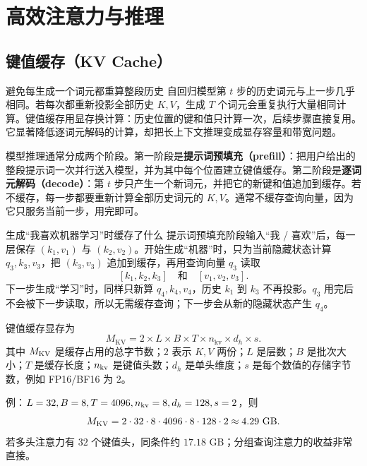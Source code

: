\part{高效注意力与推理}

\chapter{键值缓存（KV Cache）}
\label{sec:kvcache}

\figKVCache

\begin{motivationbox}{避免每生成一个词元都重算整段历史}
自回归模型第 $t$ 步的历史词元与上一步几乎相同。若每次都重新投影全部历史 $K,V$，生成 $T$ 个词元会重复执行大量相同计算。键值缓存用显存换计算：历史位置的键和值只计算一次，后续步骤直接复用。它显著降低逐词元解码的计算，却把长上下文推理变成显存容量和带宽问题。
\end{motivationbox}

模型推理通常分成两个阶段。第一阶段是\textbf{提示词预填充（prefill）}：把用户给出的整段提示词一次并行送入模型，并为其中每个位置建立键值缓存。第二阶段是\textbf{逐词元解码（decode）}：第 $t$ 步只产生一个新词元，并把它的新键和值追加到缓存。若不缓存，每一步都要重新计算全部历史词元的 $K,V$。通常不缓存查询向量，因为它只服务当前一步，用完即可。

\begin{examplebox}{生成“我喜欢机器学习”时缓存了什么}
提示词预填充阶段输入“我 / 喜欢”后，每一层保存 $(k_1,v_1)$ 与 $(k_2,v_2)$。开始生成“机器”时，只为当前隐藏状态计算 $q_3,k_3,v_3$，把 $(k_3,v_3)$ 追加到缓存，再用查询向量 $q_3$ 读取
\[
[k_1,k_2,k_3]\quad\text{和}\quad[v_1,v_2,v_3].
\]
下一步生成“学习”时，同样只新算 $q_4,k_4,v_4$，历史 $k_1$ 到 $k_3$ 不再投影。$q_3$ 用完后不会被下一步读取，所以无需缓存查询；下一步会从新的隐藏状态产生 $q_4$。
\end{examplebox}

\begin{mathbox}
键值缓存显存为
\[
M_{\mathrm{KV}}=
2\times L\times B\times T\times n_{\mathrm{kv}}\times d_h\times s.
\]
其中 $M_{\rm KV}$ 是缓存占用的总字节数；$2$ 表示 $K,V$ 两份；$L$ 是层数；$B$ 是批次大小；$T$ 是缓存长度；$n_{\rm kv}$ 是键值头数；$d_h$ 是单头维度；$s$ 是每个数值的存储字节数，例如 FP16/BF16 为 $2$。
\end{mathbox}

例：$L=32,B=8,T=4096,n_{\rm kv}=8,d_h=128,s=2$，则
\[
M_{\rm KV}=2\cdot32\cdot8\cdot4096\cdot8\cdot128\cdot2
\approx4.29\text{ GB}.
\]
若多头注意力有 $32$ 个键值头，同条件约 $17.18$ GB；分组查询注意力的收益非常直接。

